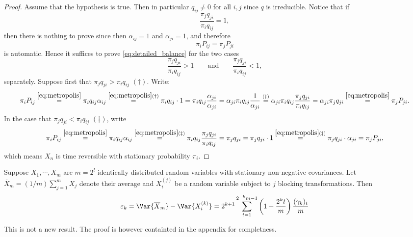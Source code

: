 \documentclass[11pt,english,a4paper]{article}
\begin{document}
\begin{proof}
Assume that the hypothesis is true. Then in particular $q_{  ij} \neq 0$ for all $i,j$ since $q$ is irreducible. Notice that if 
\[
\frac{\pi_j q_{  ji}}{\pi_i q_{  ij}} = 1,
\]
then there is nothing to prove since then $\alpha_{ij} = 1$ and $\alpha_{ji} = 1$, and therefore
\begin{equation}
\pi_iP_{  ij} = \pi_jP_{  ji} \label{eq:detailed_balance}
\end{equation} 
is automatic. Hence it suffices to prove \eqref{eq:detailed_balance} for the two cases
\[
\frac{\pi_j q_{  ji}}{\pi_i q_{  ij}} > 1 \qquad \text{and} \qquad \frac{\pi_j q_{  ji}}{\pi_i q_{  ij}} < 1,
\]
separately. Suppose first that $\pi_j q_{  ji} > \pi_i q_{  ij}$ $(\dagger)$. Write:
\[
\pi_iP_{  ij} \stackrel{\eqref{eq:metropolis}}{=} \pi_i  q_{  ij} \alpha_{  ij} \stackrel{\eqref{eq:metropolis}(\dagger)}{=} \pi_i q_{  ij} \cdot 1 =
\pi_i q_{  ij}  \frac{\alpha_{  ji}}{\alpha_{  ji}} = \alpha_{  ji}\pi_i q_{  ij}  \frac{1}{\alpha_{  ji}} \stackrel{(\dagger)}{=} \alpha_{  ji}\pi_i q_{  ij}  \frac{\pi_j q_{  ji}}{\pi_i q_{  ij}} = \alpha_{  ji}  \pi_j q_{  ji} \stackrel{\eqref{eq:metropolis}}{=} \pi_jP_{  ji}. 
\]
In the case that $\pi_j q_{  ji} < \pi_i q_{  ij}$ $(\ddagger)$, write
\[
\pi_iP_{  ij} \stackrel{\eqref{eq:metropolis}}{=} \pi_i  q_{  ij} \alpha_{  ij} \stackrel{\eqref{eq:metropolis}(\ddagger)}{=} \pi_i q_{  ij} \frac{\pi_j q_{  ji}}{\pi_i q_{  ij}} = \pi_j q_{  ji} = \pi_j q_{  ji} \cdot 1 \stackrel{\eqref{eq:metropolis}(\ddagger)}{=} \pi_j q_{  ji} \cdot \alpha_{  ji} = \pi_jP_{  ji},
\]
which means $X_n$ is time reversible with stationary probability $\pi_i$.
\end{proof}
\begin{prop*}
Suppose $X_1,\cdots, X_m$ are $m = 2^l$ identically distributed random variables with stationary non-negative covariances. Let $\overline X_m = (1/m)\sum_{j=1}^m X_j$ denote their average and $X^{(j)}_i$ be a random variable subject to $j$ blocking transformations. Then
\[
\varepsilon_k = \Var{\overline X_m} - \Var{X^{(k)}_i} = 2^{k+1} \sum_{t=1}^{2^{-k}m-1} \left( 1 - \frac{2^{k}t}{m} \right) \frac{(\gamma_k)_t}{m}
\]
\end{prop*}
This is not a new result. The proof is however containted in the appendix for completness.
\end{document}

